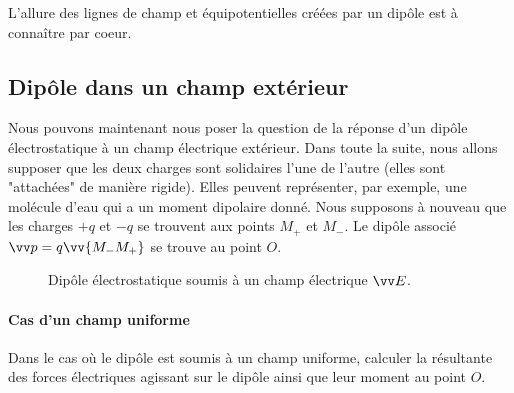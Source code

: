 \documentclass[11pt,fleqn]{book} %
\begin{document}
\begin{remark}
    L'allure des lignes de champ et équipotentielles créées par un dipôle est à connaître par coeur.
\end{remark}

\subsection{Dipôle dans un champ extérieur}

Nous pouvons maintenant nous poser la question de la réponse d'un dipôle électrostatique à un champ électrique extérieur. Dans toute la suite, nous allons supposer que les deux charges sont solidaires l'une de l'autre (elles sont "attachées" de manière rigide). Elles peuvent représenter, par exemple, une molécule d'eau qui a un moment dipolaire donné. Nous supposons à nouveau que les charges $+q$ et $-q$ se trouvent aux points $M_+$ et $M_-$. Le dipôle associé $\vv p = q \vv{M_- M_+}$ se trouve au point $O$.

\begin{figure}[htbp]
\centering
{}
\caption{Dipôle électrostatique soumis à un champ électrique $\vv E$.}
\end{figure}

\paragraph{Cas d'un champ uniforme}

\begin{capex}
Dans le cas où le dipôle est soumis à un champ uniforme, calculer la résultante des forces électriques agissant sur le dipôle ainsi que leur moment au point $O$.
\end{capex}
\end{document}
